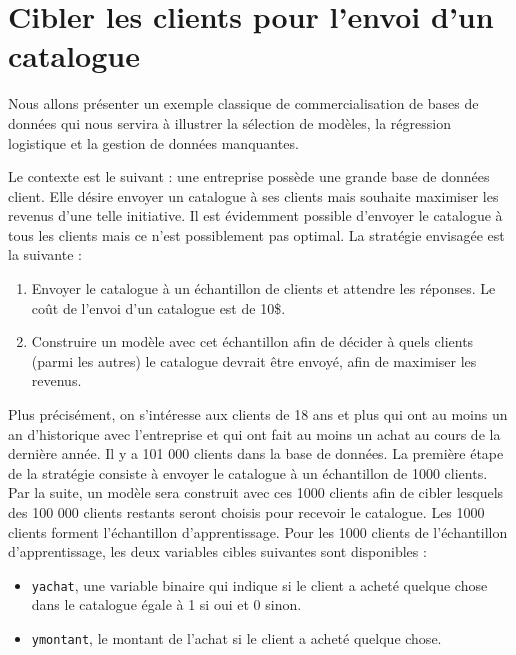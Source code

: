 \documentclass[
  11pt,
  letterpaper,
]{book}
\providecommand{\tightlist}{%
  \setlength{\itemsep}{0pt}\setlength{\parskip}{0pt}}
\theoremstyle{definition}
\theoremstyle{definition}
\theoremstyle{definition}
\theoremstyle{remark}
\begin{document}
\hypertarget{cibler-les-clients-pour-lenvoi-dun-catalogue}{%
\section{Cibler les clients pour l'envoi d'un catalogue}\label{cibler-les-clients-pour-lenvoi-dun-catalogue}}

Nous allons présenter un exemple classique de commercialisation de bases de données qui nous servira à illustrer la sélection de modèles, la régression logistique et la gestion de données manquantes.

Le contexte est le suivant : une entreprise possède une grande base de données client. Elle désire envoyer un catalogue à ses clients mais souhaite maximiser les revenus d'une telle initiative. Il est évidemment possible d'envoyer le catalogue à tous les clients mais ce n'est possiblement pas optimal. La stratégie envisagée est la suivante :

\begin{enumerate}
\def\labelenumi{\arabic{enumi}.}
\tightlist
\item
  Envoyer le catalogue à un échantillon de clients et attendre les réponses. Le coût de l'envoi d'un catalogue est de 10\$.
\item
  Construire un modèle avec cet échantillon afin de décider à quels clients (parmi les autres) le catalogue devrait être envoyé, afin de maximiser les revenus.
\end{enumerate}

Plus précisément, on s'intéresse aux clients de 18 ans et plus qui ont au moins un an d'historique avec l'entreprise et qui ont fait au moins un achat au cours de la dernière année. Il y a 101 000 clients dans la base de données. La première étape de la stratégie consiste à envoyer le catalogue à un échantillon de 1000 clients. Par la suite, un modèle sera construit avec ces 1000 clients afin de cibler lesquels des 100 000 clients restants seront choisis pour recevoir le catalogue. Les 1000 clients forment l'échantillon d'apprentissage. Pour les 1000 clients de l'échantillon d'apprentissage, les deux variables cibles suivantes sont disponibles :

\begin{itemize}
\tightlist
\item
  \texttt{yachat}, une variable binaire qui indique si le client a acheté quelque chose dans le catalogue égale à 1 si oui et 0 sinon.
\item
  \texttt{ymontant}, le montant de l'achat si le client a acheté quelque chose.
\end{itemize}
\end{document}
